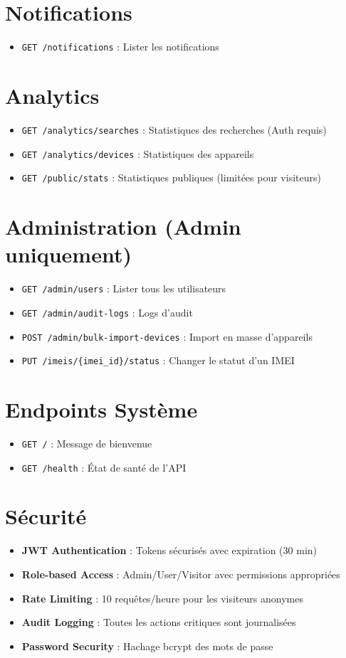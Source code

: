 \documentclass{article}
\begin{document}
\section{Notifications}
\begin{itemize}
    \item \texttt{GET /notifications} : Lister les notifications
\end{itemize}

\section{Analytics}
\begin{itemize}
    \item \texttt{GET /analytics/searches} : Statistiques des recherches (Auth requis)
    \item \texttt{GET /analytics/devices} : Statistiques des appareils
    \item \texttt{GET /public/stats} : Statistiques publiques (limitées pour visiteurs)
\end{itemize}

\section{Administration (Admin uniquement)}
\begin{itemize}
    \item \texttt{GET /admin/users} : Lister tous les utilisateurs
    \item \texttt{GET /admin/audit-logs} : Logs d'audit
    \item \texttt{POST /admin/bulk-import-devices} : Import en masse d'appareils
    \item \texttt{PUT /imeis/\{imei\_id\}/status} : Changer le statut d'un IMEI
\end{itemize}

\section{Endpoints Système}
\begin{itemize}
    \item \texttt{GET /} : Message de bienvenue
    \item \texttt{GET /health} : État de santé de l'API
\end{itemize}

\section{Sécurité}
\begin{itemize}
    \item \textbf{JWT Authentication} : Tokens sécurisés avec expiration (30 min)
    \item \textbf{Role-based Access} : Admin/User/Visitor avec permissions appropriées
    \item \textbf{Rate Limiting} : 10 requêtes/heure pour les visiteurs anonymes
    \item \textbf{Audit Logging} : Toutes les actions critiques sont journalisées
    \item \textbf{Password Security} : Hachage bcrypt des mots de passe
\end{itemize}
\end{document}
